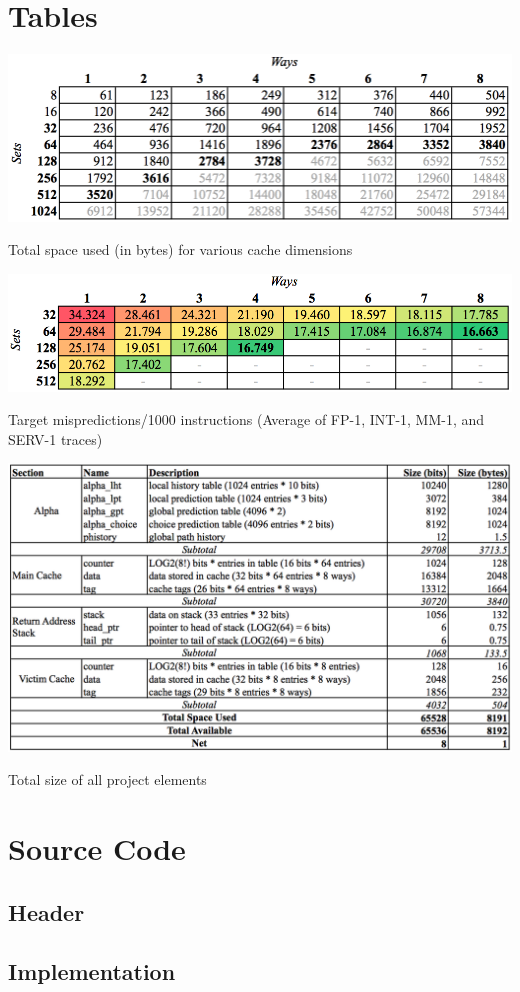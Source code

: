 \documentclass[twocolumn]{article}
\newcommand{\centertable}[3]{
\begin{table}[ht!]  
\begin{center} #1
\caption{#2}
\label{#3}
\end{center}
\end{table}}
\begin{document}
\section{Tables}
\vspace{-.15in}\centertable{\includegraphics[width=5.25in]{img/sizebydim.png}}{Total space used (in bytes) for various cache dimensions}{sizebydim}
\vspace{-.35in}\centertable{\includegraphics[width=5.25in]{img/mispersize.png}}{Target mispredictions/1000 instructions (Average of FP-1, INT-1, MM-1, and SERV-1 traces)}{mispersize}
\centertable{\includegraphics[width=\columnwidth]{img/sizebudget.png}}{Total size of all project elements}{sizebudget}
\section{Source Code}

\subsection*{Header}


\newpage
\subsection*{Implementation}

\end{document}
